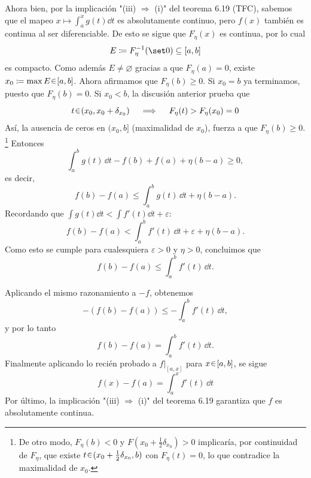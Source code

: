 \begin{sol}
\begin{enumerate}[label = (\roman*)]
Ahora bien, por la implicación "(iii) $\Rightarrow$ (i)" del teorema 6.19 (TFC), sabemos que el mapeo $x \mapsto \int^x_ag(t)\dd{t}$ es absolutamente continuo, pero $f(x)$ también es continua al ser diferenciable. De esto se sigue que $F_\eta(x)$ es continua, por lo cual
\[
E \coloneq F_\eta^{-1}(\set0) \subseteq [a,b]
\]
es compacto. Como además $E\neq\varnothing$ gracias a que $F_\eta(a) =0$, existe $x_0\coloneq\max E \en [a,b]$. Ahora afirmamos que $F_\eta(b) \ge0$. Si $x_0 = b$ ya terminamos, puesto que $F_\eta(b) = 0$. Si $x_0<b$, la discusión anterior prueba que
\[
t\en(x_0,x_0+\delta_{x_0})
\quad\implies\quad
F_\eta(t)>F_\eta(x_0)=0
\]
Así, la ausencia de ceros en $(x_0,b]$ (maximalidad de $x_0$), fuerza a que $F_\eta(b) \ge 0$.%
\footnote{
De otro modo, $F_\eta(b) < 0$ y $F(x_0+\frac12\delta_{x_0}) >0$ implicaría, por continuidad de $F_\eta$, que existe $t \en (x_0+\frac12\delta_{x_0}, b)$ con $F_\eta(t) = 0$, lo que contradice la maximalidad de $x_0$.
}
Entonces
\[
    \int_a^b g(t)\,\dd t
    -
    f(b)
    +
    f(a)
    +
    \eta(b-a)
    \ge 0,
\]
es decir,
\[
    f(b)-f(a)
    \le
    \int_a^b g(t)\,\dd t
    +
    \eta(b-a).
\]
Recordando que $\int g(t) \dd{t} < \int f'(t)\dd{t} + \varepsilon$:
\[
    f(b)-f(a)
    <
    \int_a^b f'(t)\,\dd t
    +
    \varepsilon
    +
    \eta(b-a).
\]
Como esto se cumple para cualesquiera $\varepsilon>0$ y $\eta>0$, concluimos que
\[
    f(b)-f(a)
    \le
    \int_a^b f'(t)\,\dd t.
\]

Aplicando el mismo razonamiento a $-f$, obtenemos
\[
    -(f(b)-f(a))
    \le
    -\int_a^b f'(t)\,\dd t,
\]
y por lo tanto
\[
    f(b)-f(a)
    =
    \int_a^b f'(t)\,\dd t.
\]
Finalmente aplicando lo recién probado a $f|_{[a,x]}$ para $x \en [a,b]$, se sigue
\[
    f(x)-f(a)
    =
    \int_a^x f'(t)\,\dd t
\]
Por último, la implicación "(iii) $\Rightarrow$ (i)" del teorema 6.19 garantiza que $f$ es absolutamente continua.
\end{enumerate}
\end{sol}